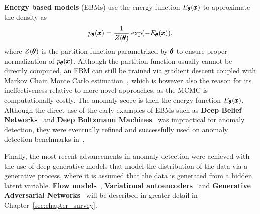 \textbf{Energy based models} (EBMs) use the energy function $E_{\pmb{{\theta}}}(\pmb{{x}})$ to approximate the density as
\begin{equation} \label{eq:ebm}
	p_{\pmb{{\theta}}}(\pmb{{x}}) =  \frac{1}{Z(\pmb{{\theta}})} \exp (- E_{\pmb{{\theta}}}(\pmb{{x}})),
\end{equation}
where $Z(\pmb{{\theta}})$ is the partition function parametrized by $\pmb{{\theta}}$ to ensure proper normalization of $p_{\pmb{{\theta}}}(\pmb{{x}})$. Although the partition function usually cannot be directly computed, an EBM can still be trained via gradient descent coupled with Markov Chain Monte Carlo estimation~\cite{hinton2002training}, which is however also the reason for its ineffectiveness relative to more novel approaches, as the MCMC is computationally costly. The anomaly score is then the energy function $E_{\pmb{{\theta}}}(\pmb{{x}})$. Although the direct use of the early examples of EBMs such as \textbf{Deep Belief Networks}~\cite{hinton2006fast} and \textbf{Deep Boltzmann Machines}~\cite{salakhutdinov2010efficient} was impractical for anomaly detection, they were eventually refined and successfully used on anomaly detection benchmarks in~\cite{zhai2016deep}. 

Finally, the most recent advancements in anomaly detection were achieved with the use of deep generative models that model the distribution of the data via a generative process, where it is assumed that the data is generated from a hidden latent variable. \textbf{Flow models}~\cite{dinh2014nice}, \textbf{Variational autoencoders}~\cite{kingma2013vae} and \textbf{Generative Adversarial Networks}~\cite{goodfellow2014gan}  will be described in greater detail in Chapter~\ref{sec:chapter_survey}.

